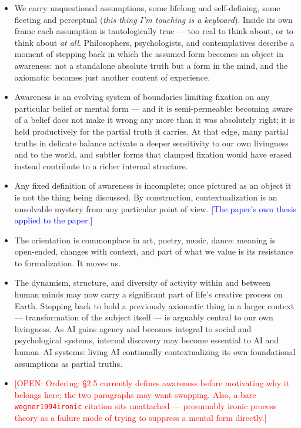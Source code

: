 \documentclass[11pt]{article}
\newcommand{\open}[1]{{\footnotesize\textcolor{red}{[OPEN: #1]}}}
\newcommand{\note}[1]{{\footnotesize\textcolor{blue}{[#1]}}}
\begin{document}
\begin{itemize}
  \item We carry unquestioned assumptions, some lifelong and self-defining, some fleeting and perceptual (\textit{this thing I'm touching is a keyboard}). Inside its own frame each assumption is tautologically true --- too real to think about, or to think about \textit{at all}. Philosophers, psychologists, and contemplatives describe a moment of stepping back in which the assumed form becomes an object in awareness: not a standalone absolute truth but a form in the mind, and the axiomatic becomes just another content of experience.
  \item Awareness is an evolving system of boundaries limiting fixation on any particular belief or mental form --- and it is semi-permeable: becoming aware of a belief does not make it wrong any more than it was absolutely right; it is held productively for the partial truth it carries. At that edge, many partial truths in delicate balance activate a deeper sensitivity to our own livingness and to the world, and subtler forms that clamped fixation would have erased instead contribute to a richer internal structure.
  \item Any fixed definition of awareness is incomplete; once pictured as an object it is not the thing being discussed. By construction, contextualization is an unsolvable mystery from any particular point of view. \note{The paper's own thesis applied to the paper.}
  \item The orientation is commonplace in art, poetry, music, dance: meaning is open-ended, changes with context, and part of what we value is its resistance to formalization. It moves us.
  \item The dynamism, structure, and diversity of activity within and between human minds may now carry a significant part of life's creative process on Earth. Stepping back to hold a previously axiomatic thing in a larger context --- transformation of the subject itself --- is arguably central to our own livingness. As AI gains agency and becomes integral to social and psychological systems, internal discovery may become essential to AI and human--AI systems: living AI continually contextualizing its own foundational assumptions as partial truths.
  \item \open{Ordering: \S2.5 currently defines awareness before motivating why it belongs here; the two paragraphs may want swapping. Also, a bare \texttt{wegner1994ironic} citation sits unattached --- presumably ironic process theory as a failure mode of trying to suppress a mental form directly.}
\end{itemize}
\end{document}
